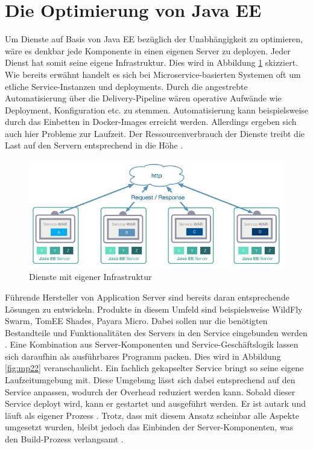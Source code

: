\section{Die Optimierung von Java EE}
Um Dienste auf Basis von Java EE bezüglich der Unabhängigkeit zu optimieren, wäre es denkbar jede Komponente in einen eigenen Server zu deployen. Jeder Dienst hat somit seine eigene Infrastruktur. Dies wird in Abbildung \ref{fig:mp2} skizziert. Wie bereits erwähnt handelt es sich bei Microservice-basierten Systemen oft um etliche Service-Instanzen und deployments. Durch die angestrebte Automatisierung über die Delivery-Pipeline wären operative Aufwände wie Deployment, Konfiguration etc. zu stemmen. Automatisierung kann beispielsweise durch das Einbetten in Docker-Images erreicht werden. Allerdings ergeben sich auch hier Probleme zur Laufzeit. Der Ressourcenverbrauch der Dienste treibt die Last auf den Servern entsprechend in die Höhe \cite{LarsRowekamp.2017d}. \\
\begin{figure}[h!]
	\centering
	\includegraphics[width=1.0\linewidth]{images/mp2}
	\caption{Dienste mit eigener Infrastruktur \cite{LarsRowekamp.2017d}}
	\label{fig:mp2}
\end{figure}
Führende Hersteller von Application Server sind bereits daran entsprechende Lösungen zu entwickeln. Produkte in diesem Umfeld sind beispielsweise WildFly Swarm, TomEE Shades, Payara Micro. Dabei sollen nur die benötigten Bestandteile und Funktionalitäten des Servers in den Service eingebunden werden \cite{jaxcenter.2016}. Eine Kombination aus Server-Komponenten und Service-Geschäftslogik lassen sich daraufhin als ausführbares Programm packen. Dies wird in Abbildung \ref{fig:mp22} veranschaulicht. Ein fachlich gekapselter Service bringt so seine eigene Laufzeitumgebung mit. Diese Umgebung lässt sich dabei entsprechend auf den Service anpassen, wodurch der Overhead reduziert werden kann. Sobald dieser Service deployt wird, kann er gestartet und ausgeführt werden. Er ist autark und läuft als eigener Prozess \cite{jaxcenter.2016}. Trotz, dass mit diesem Ansatz scheinbar alle Aspekte umgesetzt wurden, bleibt jedoch das Einbinden der Server-Komponenten, was den Build-Prozess verlangsamt \cite{LarsRowekamp.2017d}.
